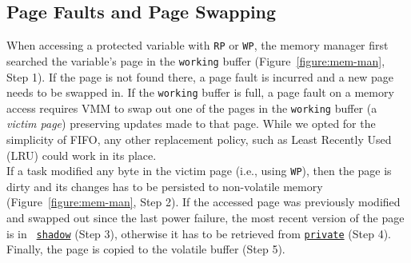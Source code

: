 \subsection{Page Faults and Page Swapping}
%
When accessing a protected variable with \texttt{RP} or \texttt{WP}, the memory
manager first searched the variable's page in the \texttt{working} buffer
(Figure~\ref{figure:mem-man}, Step 1).
If the page is not found there, a page fault is incurred and a new page needs to
be swapped in.
If the \texttt{working} buffer is full, a page fault on a memory access
requires VMM to swap out one of the pages in the \texttt{working} buffer (a
\emph{victim page}) preserving updates made to that page.
%
While we opted for the simplicity of FIFO, any other replacement policy, such
as Least Recently Used (LRU) could work in its place. \\
%
If a task modified any byte in the victim page (i.e., using \texttt{WP}), then
the page is dirty and its changes has to be persisted to non-volatile memory
(Figure~\ref{figure:mem-man}, Step 2).
If the accessed page was previously modified and swapped out since the last
power failure, the most recent version of the page is in {\tt
\underline{shadow}} (Step 3), otherwise it has to be retrieved from
{\tt \underline{private}} (Step 4).
Finally, the page is copied to the volatile buffer (Step 5). \\
%
